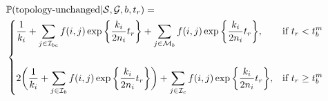 \documentclass[11pt]{article}
\begin{document}
\begin{equation}
\begin{aligned}
	&\mathbb{P}(\textrm{topology-unchanged} | \mathcal{S},\mathcal{G},b,t_r)=
	\\
	&\begin{dcases}
		\frac{1}{k_i} + 
		\sum_{j \in \mathcal{I}_{bc}} f(i,j) \exp \bigg\{ \frac{k_i}{2n_i}t_r \bigg\} + 
		\sum_{j \in \mathcal{M}_b} f(i,j) \exp \bigg\{ \frac{k_i}{2n_i}t_r \bigg\}, 
		& \text{if } t_r < t_b^m \\
		\\
		2\bigg(
			\frac{1}{k_i} + 
			\sum_{j \in \mathcal{I}_b} f(i,j) \exp \bigg\{ \frac{k_i}{2n_i}t_r \bigg\}
		\bigg) + 
		\sum_{j \in \mathcal{I}_c} f(i,j) \exp\bigg\{ \frac{k_i}{2n_i}t_r \bigg\},
		& \text{if } t_r \ge t_b^m \\
	\end{dcases}
\end{aligned}
\end{equation}





\end{document}
